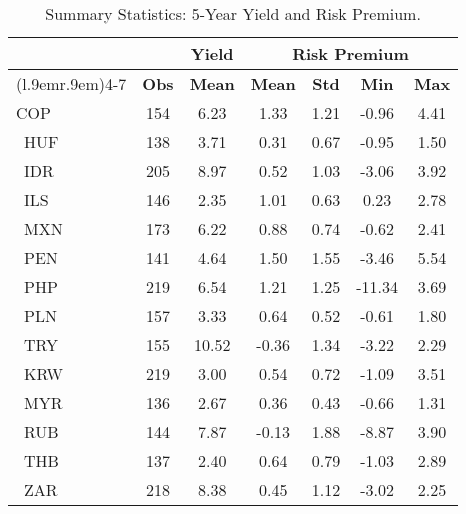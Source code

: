 \begin{table}
	\centering
\begin{tabular}{l|cccccc}
\toprule
\multicolumn{1}{c}{}& &\textbf{Yield}&\multicolumn{4}{c}{\textbf{Risk Premium}}\\
\cmidrule(l{.9em}r{.9em}){4-7}
\multicolumn{1}{c}{}&\textbf{Obs}&\textbf{Mean}&\textbf{Mean}&\textbf{Std}&\textbf{Min}&\textbf{Max}\\\midrule
{ COP}&154&6.23&1.33&1.21&-0.96&4.41\\\
{HUF}&138&3.71&0.31&0.67&-0.95&1.50\\\
{IDR}&205&8.97&0.52&1.03&-3.06&3.92\\\
{ILS}&146&2.35&1.01&0.63&0.23&2.78\\\
{MXN}&173&6.22&0.88&0.74&-0.62&2.41\\\
{PEN}&141&4.64&1.50&1.55&-3.46&5.54\\\
{PHP}&219&6.54&1.21&1.25&-11.34&3.69\\\
{PLN}&157&3.33&0.64&0.52&-0.61&1.80\\\
{TRY}&155&10.52&-0.36&1.34&-3.22&2.29\\\
{KRW}&219&3.00&0.54&0.72&-1.09&3.51\\\
{MYR}&136&2.67&0.36&0.43&-0.66&1.31\\\
{RUB}&144&7.87&-0.13&1.88&-8.87&3.90\\\
{THB}&137&2.40&0.64&0.79&-1.03&2.89\\\
{ZAR}&218&8.38&0.45&1.12&-3.02&2.25\\ \bottomrule
\end{tabular}
\\
\caption{Summary Statistics: 5-Year Yield and Risk Premium.}\label{tab:rp_stats}
\end{table}